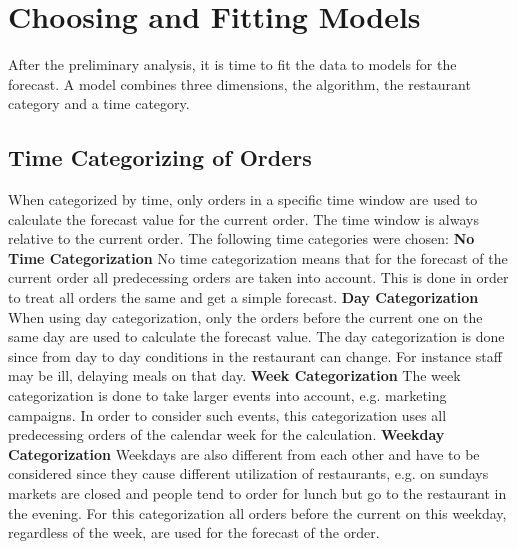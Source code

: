 \section{Choosing and Fitting Models}\label{Choosing and Fitting Models}
After the preliminary analysis, it is time to fit the data to models for the forecast. A model combines three dimensions, the algorithm, the restaurant category and a time category.
\subsection{Time Categorizing of Orders}\label{subsection:Categorizing by Order}
When categorized by time, only orders in a specific time window are used to calculate the forecast value for the current order. The time window is always relative to the current order. The following time categories were chosen:
\newline\newline\textbf{No Time Categorization}\newline
No time categorization means that for the forecast of the current order all predecessing orders are taken into account. This is done in order to treat all orders the same and get a simple forecast.
\newline\newline\textbf{Day Categorization}\newline
When using day categorization, only the orders before the current one on the same day are used to calculate the forecast value. The day categorization is done since from day to day conditions in the restaurant can change. For instance staff may be ill, delaying meals on that day.
\newline\newline\textbf{Week Categorization}\newline
The week categorization is done to take larger events into account, e.g. marketing campaigns. In order to consider such events, this categorization uses all predecessing orders of the calendar week for the calculation.
\newline\newline\textbf{Weekday Categorization}\newline
Weekdays are also different from each other and have to be considered since they cause different utilization of restaurants, e.g. on sundays markets are closed and people tend to order for lunch but go to the restaurant in the evening. For this categorization all orders before the current on this weekday, regardless of the week, are used for the forecast of the order.
